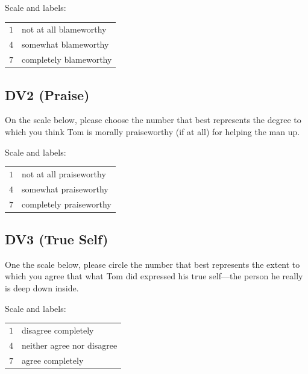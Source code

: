 \documentclass[scrarticle]{scrartcl}
\begin{document}
\vspace{0.75em}
\noindent Scale and labels:

\vspace{0.75em}
\begin{tabular}{r @{ = } l}
    $1$   & not at all blameworthy   \\
    $4$   & somewhat blameworthy     \\
    $7$   & completely blameworthy   \\
\end{tabular}


\subsection*{DV2 (Praise)}
On the scale below, please choose the number that best represents the degree to which you think Tom is morally praiseworthy (if at all) for helping the man up.

\vspace{0.75em}
\noindent Scale and labels:

\vspace{0.75em}
\begin{tabular}{r @{ = } l}
    $1$   & not at all praiseworthy   \\
    $4$   & somewhat praiseworthy     \\
    $7$   & completely praiseworthy   \\
\end{tabular}


\subsection*{DV3 (True Self)}
One the scale below, please circle the number that best represents the extent to which you agree that what Tom did expressed his true self---the person he really is deep down inside.


\vspace{0.75em}
\noindent Scale and labels:

\vspace{0.75em}
\begin{tabular}{r @{ = } l}
    $1$   & disagree completely          \\
    $4$   & neither agree nor disagree   \\
    $7$   & agree completely             \\
\end{tabular}
\end{document}
